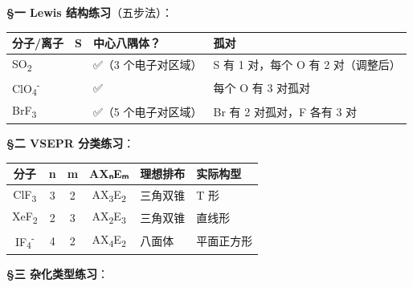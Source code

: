\documentclass[a4paper,11pt]{ctexart}
\newcounter{none}
\begin{document}
\textbf{§一 Lewis 结构练习}（五步法）：

{\def\LTcaptype{none} %
\begin{longtable}[]{@{}
  >{\centering\arraybackslash}p{}
  >{\centering\arraybackslash}p{}
  >{\centering\arraybackslash}p{}
  >{\raggedright\arraybackslash}p{}@{}}
\toprule\noalign{}
\begin{minipage}[b]{\linewidth}\centering
分子/离子
\end{minipage} & \begin{minipage}[b]{\linewidth}\centering
S
\end{minipage} & \begin{minipage}[b]{\linewidth}\centering
中心八隅体？
\end{minipage} & \begin{minipage}[b]{\linewidth}\raggedright
孤对
\end{minipage} \\
\midrule\noalign{}
\endhead
\bottomrule\noalign{}
\endlastfoot
SO\textsubscript{2} & 18 & ✅（3 个电子对区域） & S 有 1 对，每个 O 有 2 对（调整后） \\
ClO\textsubscript{4}\textsuperscript{-} & 32 & ✅ & 每个 O 有 3 对孤对 \\
BrF\textsubscript{3} & 28 & ✅（5 个电子对区域） & Br 有 2 对孤对，F 各有 3 对 \\
\end{longtable}
}

\textbf{§二 VSEPR 分类练习}：

{\def\LTcaptype{none} %
\begin{longtable}[]{@{}ccccll@{}}
\toprule\noalign{}
分子 & n & m & AXₙEₘ & 理想排布 & 实际构型 \\
\midrule\noalign{}
\endhead
\bottomrule\noalign{}
\endlastfoot
ClF\textsubscript{3} & 3 & 2 & AX\textsubscript{3}E\textsubscript{2} & 三角双锥 & T 形 \\
XeF\textsubscript{2} & 2 & 3 & AX\textsubscript{2}E\textsubscript{3} & 三角双锥 & 直线形 \\
IF\textsubscript{4}\textsuperscript{-} & 4 & 2 & AX\textsubscript{4}E\textsubscript{2} & 八面体 & 平面正方形 \\
\end{longtable}
}

\textbf{§三 杂化类型练习}：
\end{document}
